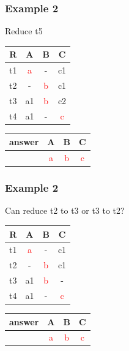 \documentclass{beamer}
\begin{document}
\begin{frame}
  \frametitle{Example 2}
  Reduce t5
  
  \begin{tabular}{ c | c c c}
  R & A & B & C \\
  \hline
  t1 & \textcolor{red}{a}  & -  & c1 \\
  t2 & -  & \textcolor{red}{b}  & c1 \\
  t3 & a1 & \textcolor{red}{b} & c2 \\
  t4 & a1 & - & \textcolor{red}{c} \\
  \end{tabular}
  \begin{tabular}{ c | c c c}
  answer & A & B & C \\
  \hline
   & \textcolor{red}{a}& \textcolor{red}{b}& \textcolor{red}{c}\\
  \end{tabular}
\end{frame}

\begin{frame}
  \frametitle{Example 2}
  
  Can reduce t2 to t3 or t3 to t2?
  
  \begin{tabular}{ c | c c c}
  R & A & B & C \\
  \hline
  t1 & \textcolor{red}{a}  & -  & c1 \\
  t2 & -  & \textcolor{red}{b}  & c1 \\
  t3 & a1 & \textcolor{red}{b} & - \\
  t4 & a1 & - & \textcolor{red}{c} \\
  \end{tabular}
  \begin{tabular}{ c | c c c}
  answer & A & B & C \\
  \hline
   & \textcolor{red}{a}& \textcolor{red}{b}& \textcolor{red}{c}\\
  \end{tabular}
\end{frame}
\end{document}
